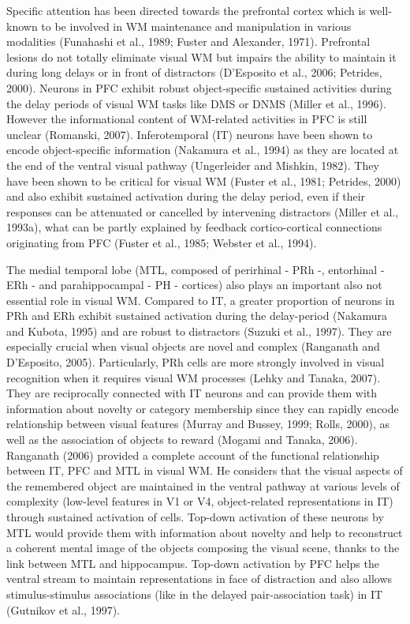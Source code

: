 \documentclass[
  11pt,
  a4paper,
]{scrbook}
\begin{document}
Specific attention has been directed towards the prefrontal cortex which
is well-known to be involved in WM maintenance and manipulation in
various modalities (Funahashi et al., 1989; Fuster and Alexander, 1971).
Prefrontal lesions do not totally eliminate visual WM but impairs the
ability to maintain it during long delays or in front of distractors
(D'Esposito et al., 2006; Petrides, 2000). Neurons in PFC exhibit robust
object-specific sustained activities during the delay periods of visual
WM tasks like DMS or DNMS (Miller et al., 1996). However the
informational content of WM-related activities in PFC is still unclear
(Romanski, 2007). Inferotemporal (IT) neurons have been shown to encode
object-specific information (Nakamura et al., 1994) as they are located
at the end of the ventral visual pathway (Ungerleider and Mishkin,
1982). They have been shown to be critical for visual WM (Fuster et al.,
1981; Petrides, 2000) and also exhibit sustained activation during the
delay period, even if their responses can be attenuated or cancelled by
intervening distractors (Miller et al., 1993a), what can be partly
explained by feedback cortico-cortical connections originating from PFC
(Fuster et al., 1985; Webster et al., 1994).

The medial temporal lobe (MTL, composed of perirhinal - PRh -,
entorhinal - ERh - and parahippocampal - PH - cortices) also plays an
important also not essential role in visual WM. Compared to IT, a
greater proportion of neurons in PRh and ERh exhibit sustained
activation during the delay-period (Nakamura and Kubota, 1995) and are
robust to distractors (Suzuki et al., 1997). They are especially crucial
when visual objects are novel and complex (Ranganath and D'Esposito,
2005). Particularly, PRh cells are more strongly involved in visual
recognition when it requires visual WM processes (Lehky and Tanaka,
2007). They are reciprocally connected with IT neurons and can provide
them with information about novelty or category membership since they
can rapidly encode relationship between visual features (Murray and
Bussey, 1999; Rolls, 2000), as well as the association of objects to
reward (Mogami and Tanaka, 2006). Ranganath (2006) provided a complete
account of the functional relationship between IT, PFC and MTL in visual
WM. He considers that the visual aspects of the remembered object are
maintained in the ventral pathway at various levels of complexity
(low-level features in V1 or V4, object-related representations in IT)
through sustained activation of cells. Top-down activation of these
neurons by MTL would provide them with information about novelty and
help to reconstruct a coherent mental image of the objects composing the
visual scene, thanks to the link between MTL and hippocampus. Top-down
activation by PFC helps the ventral stream to maintain representations
in face of distraction and also allows stimulus-stimulus associations
(like in the delayed pair-association task) in IT (Gutnikov et al.,
1997).
\end{document}
